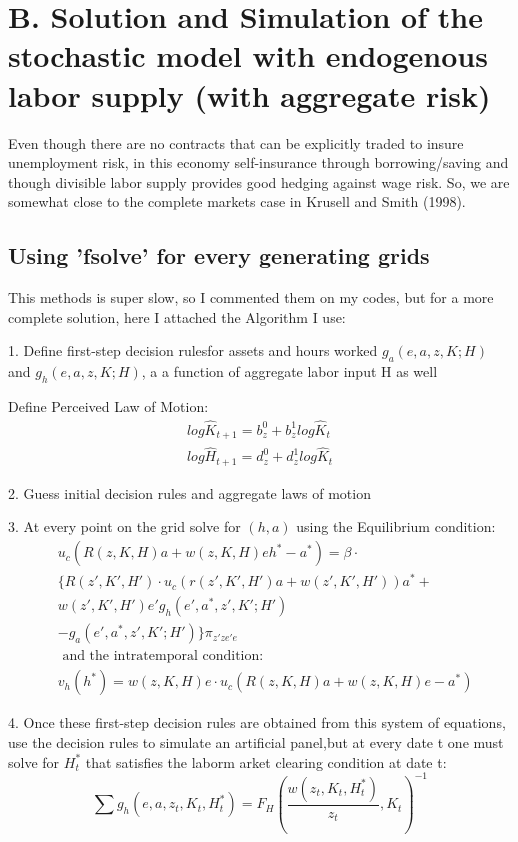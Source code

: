 \section{B. Solution and Simulation of the stochastic model with endogenous labor supply (with aggregate risk)}

Even though there are no contracts that can be explicitly traded to insure unemployment risk, in this economy self-insurance through borrowing/saving and though divisible labor supply provides good hedging against wage risk. So, we are somewhat close to the complete markets case in Krusell and Smith (1998). 

\subsection{Using 'fsolve' for every generating grids}
This methods is super slow, so I commented them on my codes, but for a more complete solution, here I attached the Algorithm I use:

1. Define first-step decision rulesfor assets and hours worked $g_a (e,a,z,K;H)$ and $g_h (e,a,z,K;H)$, a a function of aggregate labor input H as well

Define Perceived Law of Motion: 
\begin{align}
log \hat{K}_{t+1} = b^0_z + b^1_z log \hat{K}_{t} \\
log \hat{H}_{t+1} = d^0_z + d^1_z log \hat{K}_{t} 
\end{align}

2. Guess initial decision rules and aggregate laws of motion

3. At every point on the grid solve for $(h,a)$ using the Equilibrium condition:
\begin{align}
&u_c (R(z,K,H)a + w(z,K,H)eh^* - a^*) = \beta \cdot\\
&  \{ R(z',K',H')\cdot u_c(r(z',K',H')a + w(z',K',H'))a^* + \\
&w(z',K',H')e' g_h (e',a^*,z',K';H') \\
&- g_a (e',a^*,z',K';H')\} \pi_{z'ze'e} \\
&\text{ and the intratemporal condition: } \\
&v_h (h^*) = w(z,K,H)e \cdot u_c (R(z,K,H)a + w(z,K,H)e - a^*)
\end{align}

4. Once these first-step decision rules are obtained from this system  of equations, use the decision rules to simulate an artificial panel,but at every date t one must solve for $H^*_t$ that satisfies the laborm arket clearing condition at date t:
\[ \sum g_h (e,a,z_t,K_t,H^*_t) = F_H (\frac{w(z_t,K_t,H^*_t)}{z_t},K_t)^{-1}\]

